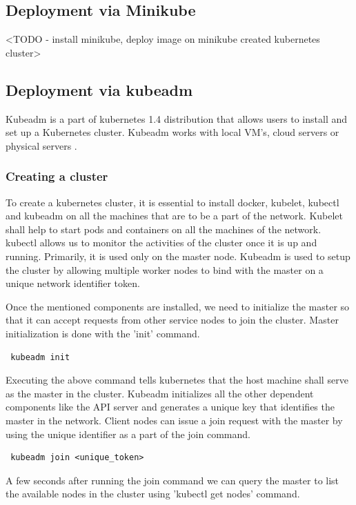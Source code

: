 \documentclass[9pt,twocolumn,twoside]{../../styles/osajnl}
\begin{document}
\subsection{Deployment via Minikube}
<TODO - install minikube, deploy image on minikube created kubernetes cluster>

\subsection{Deployment via kubeadm}

Kubeadm is a part of kubernetes 1.4 distribution that allows users to
install and set up a Kubernetes cluster. Kubeadm works with local
VM's, cloud servers or physical servers \cite{www-kubernetes-kubeadm}.

\subsubsection{Creating a cluster}
To create a kubernetes cluster, it is essential to install docker,
kubelet, kubectl and kubeadm on all the machines that are to be a part
of the network. Kubelet shall help to start pods and containers on all
the machines of the network.  kubectl allows us to monitor the
activities of the cluster once it is up and running. Primarily, it is
used only on the master node. Kubeadm is used to setup the cluster by
allowing multiple worker nodes to bind with the master on a unique
network identifier token.

Once the mentioned components are installed, we need to initialize the
master so that it can accept requests from other service nodes to join
the cluster. Master initialization is done with the 'init' command.

\begin{verbatim}
 kubeadm init
\end{verbatim}

Executing the above command tells kubernetes that the host machine
shall serve as the master in the cluster. Kubeadm initializes all the
other dependent components like the API server and generates a unique
key that identifies the master in the network. Client nodes can issue
a join request with the master by using the unique identifier as a
part of the join command.

\begin{verbatim}
 kubeadm join <unique_token>
\end{verbatim}

A few seconds after running the join command we can query the master
to list the available nodes in the cluster using 'kubectl get nodes' command.
\end{document}
